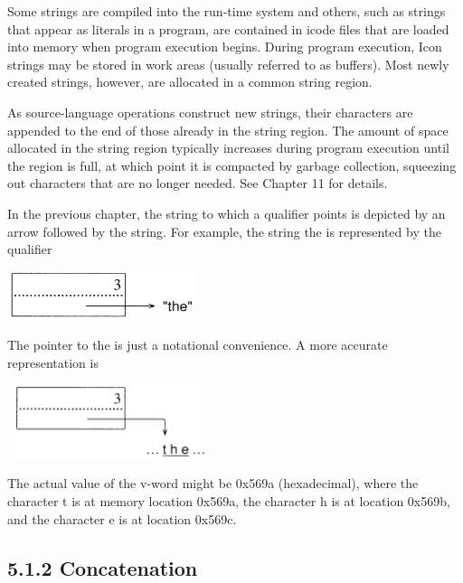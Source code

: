 Some strings are compiled into the run-time system and others, such as
strings that appear as literals in a program, are contained in icode
files that are loaded into memory when program execution
begins. During program execution, Icon strings may be stored in work
areas (usually referred to as
{\textquotedbl}buffers{\textquotedbl}). Most newly created strings,
however, are allocated in a common string region.

As source-language operations construct new strings, their characters
are appended to the end of those already in the string region. The
amount of space allocated in the string region typically increases
during program execution until the region is full, at which point it
is compacted by garbage collection, squeezing out characters that are
no longer needed. See Chapter 11 for details.

In the previous chapter, the string to which a qualifier points is
depicted by an arrow followed by the string. For example, the string
{\textquotedbl}the{\textquotedbl} is represented by the qualifier

\begin{center}
\includegraphics[width=2.1925in,height=0.5598in]{ib-img/ib-img018.png}
\end{center}

The pointer to {\textquotedbl}the{\textquotedbl} is just a notational
convenience. A more accurate representation is

\begin{center}
\includegraphics[width=2.3835in,height=0.85in]{ib-img/ib-img019.png}
\end{center}

The actual value of the v-word might be 0x569a (hexadecimal), where
the character t is at memory location 0x569a, the character h is at
location 0x569b, and the character e is at location 0x569c.

\subsection[5.1.2 Concatenation]{5.1.2 Concatenation}


